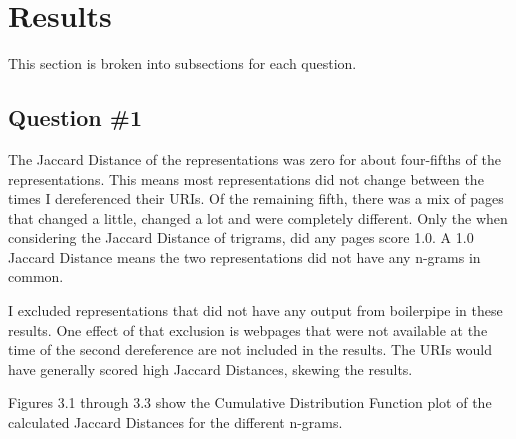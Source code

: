 \documentclass[a4paper,12pt]{article}
\begin{document}
\section{Results}
This section is broken into subsections for each question.

\subsection{Question \#1}
The Jaccard Distance of the representations was zero for about four-fifths of the representations. This means
most representations did not change between the times I dereferenced their URIs. Of the remaining fifth,
there was a mix of pages that changed a little, changed a lot and were completely different. Only the
when considering the Jaccard Distance of trigrams, did any pages score 1.0. A 1.0 Jaccard Distance means
the two representations did not have any n-grams in common.

I excluded representations that did not have any output from boilerpipe in these results. One effect of that
exclusion is webpages that were not available at the time of the second dereference are not included in the
results. The URIs would have generally scored high Jaccard Distances, skewing the results.

Figures 3.1 through 3.3 show the Cumulative Distribution Function plot of the calculated Jaccard Distances
for the different n-grams.
\end{document}
